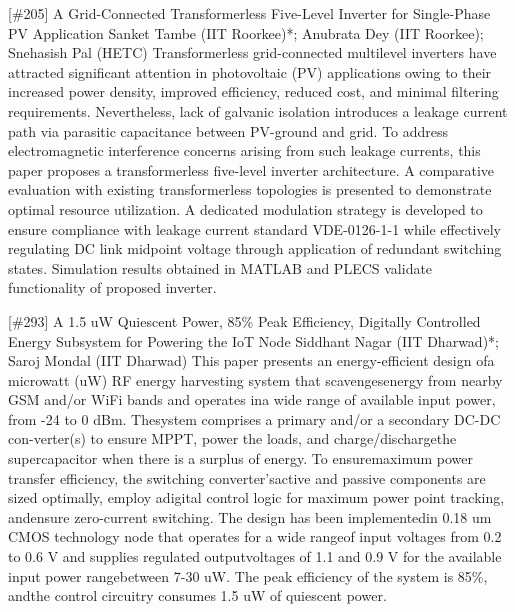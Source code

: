 {} \begin{abstract_online} {[\#205] A Grid-Connected Transformerless Five-Level Inverter for Single-Phase PV Application} {} {Sanket Tambe (IIT Roorkee)*; Anubrata  Dey (IIT Roorkee); Snehasish Pal (HETC)} {} Transformerless grid-connected multilevel inverters have attracted significant attention in photovoltaic (PV) applications owing to their increased power density, improved efficiency, reduced cost, and minimal filtering requirements.  Nevertheless, lack of galvanic isolation introduces a leakage current path via parasitic capacitance between PV-ground and grid. To address electromagnetic interference concerns arising from such leakage currents, this paper proposes a transformerless five-level inverter architecture. A comparative evaluation with existing transformerless topologies is presented to demonstrate optimal resource utilization. A dedicated modulation strategy is developed to ensure compliance with leakage current standard VDE-0126-1-1 while effectively regulating DC link midpoint voltage through application of redundant switching states. Simulation results obtained in MATLAB and PLECS validate functionality of proposed inverter. \end{abstract_online} 
{} \begin{abstract_online} {[\#293] A 1.5 uW Quiescent Power, 85\% Peak Efficiency, Digitally Controlled Energy Subsystem for Powering the IoT Node} {} {Siddhant Nagar (IIT Dharwad)*; Saroj  Mondal (IIT Dharwad)} {} This paper presents an energy-efficient design ofa microwatt (uW) RF energy harvesting system that scavengesenergy from nearby GSM and/or WiFi bands and operates ina wide range of available input power, from -24 to 0 dBm. Thesystem comprises a primary and/or a secondary DC-DC con-verter(s) to ensure MPPT, power the loads, and charge/dischargethe supercapacitor when there is a surplus of energy. To ensuremaximum power transfer efficiency, the switching converter'sactive and passive components are sized optimally, employ adigital control logic for maximum power point tracking, andensure zero-current switching. The design has been implementedin 0.18 um CMOS technology node that operates for a wide rangeof input voltages from 0.2 to 0.6 V and supplies regulated outputvoltages of 1.1 and 0.9 V for the available input power rangebetween 7-30 uW. The peak efficiency of the system is 85\%, andthe control circuitry consumes 1.5 uW of quiescent power. \end{abstract_online} 
